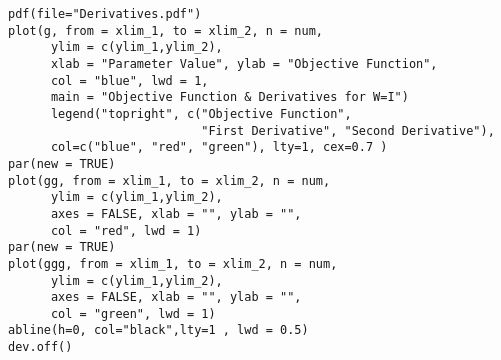 \begin{appendices}
\begin{verbatim}
pdf(file="Derivatives.pdf")
plot(g, from = xlim_1, to = xlim_2, n = num,
      ylim = c(ylim_1,ylim_2),
      xlab = "Parameter Value", ylab = "Objective Function",
      col = "blue", lwd = 1,
      main = "Objective Function & Derivatives for W=I")
      legend("topright", c("Objective Function",
                           "First Derivative", "Second Derivative"),
      col=c("blue", "red", "green"), lty=1, cex=0.7 )
par(new = TRUE)
plot(gg, from = xlim_1, to = xlim_2, n = num,
      ylim = c(ylim_1,ylim_2),
      axes = FALSE, xlab = "", ylab = "",
      col = "red", lwd = 1)
par(new = TRUE)
plot(ggg, from = xlim_1, to = xlim_2, n = num,
      ylim = c(ylim_1,ylim_2),
      axes = FALSE, xlab = "", ylab = "",
      col = "green", lwd = 1)
abline(h=0, col="black",lty=1 , lwd = 0.5)
dev.off()
\end{verbatim}


\end{appendices}
